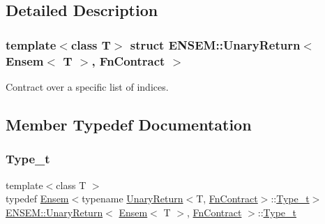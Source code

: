 \subsection{Detailed Description}
\subsubsection*{template$<$class T$>$\newline
struct E\+N\+S\+E\+M\+::\+Unary\+Return$<$ Ensem$<$ T $>$, Fn\+Contract $>$}

Contract over a specific list of indices. 

\subsection{Member Typedef Documentation}
\mbox{\label{structENSEM_1_1UnaryReturn_3_01Ensem_3_01T_01_4_00_01FnContract_01_4_a3be6c264185868ff0356a15a3b802b83}} 
\subsubsection{\texorpdfstring{Type\_t}{Type\_t}\hspace{0.1cm}{\footnotesize\ttfamily [1/3]}}
{\footnotesize\ttfamily template$<$class T $>$ \\
typedef \mbox{\hyperlink{classENSEM_1_1Ensem}{Ensem}}$<$typename \mbox{\hyperlink{structENSEM_1_1UnaryReturn}{Unary\+Return}}$<$T, \mbox{\hyperlink{structENSEM_1_1FnContract}{Fn\+Contract}}$>$\+::\mbox{\hyperlink{structENSEM_1_1UnaryReturn_3_01Ensem_3_01T_01_4_00_01FnContract_01_4_a3be6c264185868ff0356a15a3b802b83}{Type\+\_\+t}}$>$ \mbox{\hyperlink{structENSEM_1_1UnaryReturn}{E\+N\+S\+E\+M\+::\+Unary\+Return}}$<$ \mbox{\hyperlink{classENSEM_1_1Ensem}{Ensem}}$<$ T $>$, \mbox{\hyperlink{structENSEM_1_1FnContract}{Fn\+Contract}} $>$\+::\mbox{\hyperlink{structENSEM_1_1UnaryReturn_3_01Ensem_3_01T_01_4_00_01FnContract_01_4_a3be6c264185868ff0356a15a3b802b83}{Type\+\_\+t}}}

\mbox{\label{structENSEM_1_1UnaryReturn_3_01Ensem_3_01T_01_4_00_01FnContract_01_4_a3be6c264185868ff0356a15a3b802b83}} 

